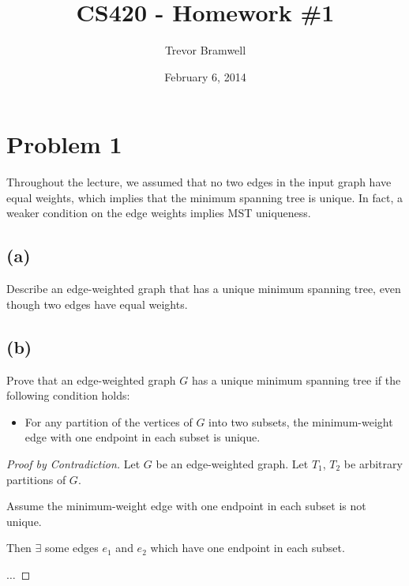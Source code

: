 \documentclass[12pt]{article}
\title{CS420 - Homework \#1}
\author{Trevor Bramwell}
\date{February 6, 2014}
\begin{document}
\maketitle

\section*{Problem 1}

Throughout the lecture, we assumed that no two edges in the input graph
have equal weights, which implies that the minimum spanning tree is
unique. In fact, a weaker condition on the edge weights implies MST
uniqueness.

\subsection*{(a)}
Describe an edge-weighted graph that has a unique minimum spanning tree,
even though two edges have equal weights.

\begin{center}
\end{center}

\subsection*{(b)}
Prove that an edge-weighted graph $G$ has a unique minimum spanning tree
if the following condition holds:

\begin{itemize}
    \item For any partition of the vertices of $G$ into two subsets, the
          minimum-weight edge with one endpoint in each subset is unique.
\end{itemize}

\begin{proof}[Proof by Contradiction]
    Let $G$ be an edge-weighted graph. Let $T_1$, $T_2$ be arbitrary
    partitions of $G$.
    
    Assume the minimum-weight edge with one endpoint in each subset is
    not unique.

    Then $\exists$ some edges $e_1$ and $e_2$ which have one endpoint in each
    subset.

    $\ldots$

\end{proof}
\end{document}
